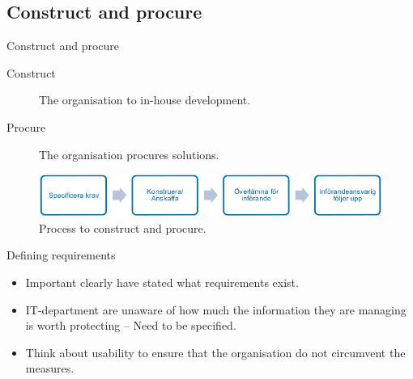 \documentclass{beamer}
\begin{document}
\subsection{Construct and procure}
\begin{frame}{Construct and procure}
  \begin{description}
    \item[Construct] The organisation to in-house development.
    \item[Procure] The organisation procures solutions.
  \end{description}
  \begin{figure}
    \includegraphics[width=\textwidth]{infora.png}
    \caption{Process to construct and procure.}
  \end{figure}
\end{frame}
\begin{frame}{Defining requirements}
  \begin{itemize}
    \item Important clearly have stated what requirements exist.
    \item IT-department are unaware of how much the information they are
      managing is worth protecting -- Need to be specified.
    \item Think about usability to ensure that the organisation do not
      circumvent the measures.
  \end{itemize}
\end{frame}
\end{document}
